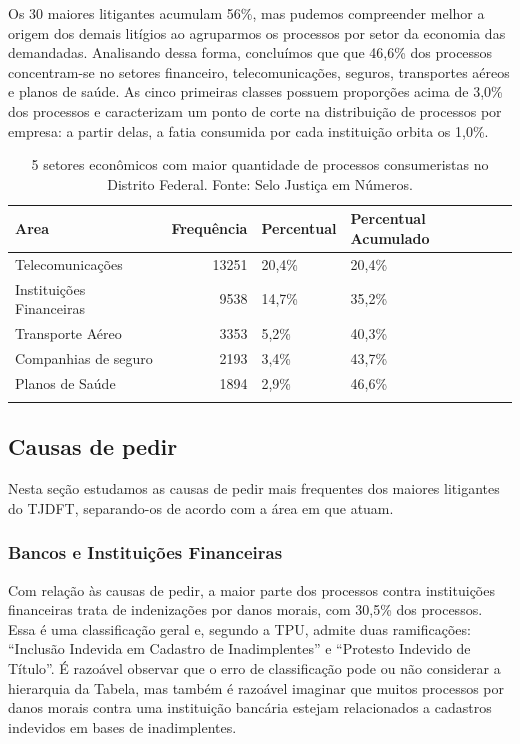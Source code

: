 \documentclass[]{report}
\begin{document}
Os 30 maiores litigantes acumulam 56\%, mas pudemos compreender melhor a
origem dos demais litígios ao agruparmos os processos por setor da
economia das demandadas. Analisando dessa forma, concluímos que que
46,6\% dos processos concentram-se no setores financeiro,
telecomunicações, seguros, transportes aéreos e planos de saúde. As
cinco primeiras classes possuem proporções acima de 3,0\% dos processos
e caracterizam um ponto de corte na distribuição de processos por
empresa: a partir delas, a fatia consumida por cada instituição orbita
os 1,0\%.

\begin{longtable}{lrll}
\caption{5 setores econômicos com maior quantidade de processos consumeristas no Distrito Federal. Fonte: Selo Justiça em Números.} \\
  \hline
Area & Frequência & Percentual & Percentual Acumulado \\
  \hline
Telecomunicações & 13251 & 20,4\% & 20,4\% \\
  Instituições
Financeiras & 9538 & 14,7\% & 35,2\% \\
  Transporte
Aéreo & 3353 & 5,2\% & 40,3\% \\
  Companhias de
seguro & 2193 & 3,4\% & 43,7\% \\
  Planos de Saúde & 1894 & 2,9\% & 46,6\% \\
   \hline
\hline
\label{unnamed-chunk-56}
\end{longtable}

\subsection{Causas de pedir}\label{causas-de-pedir-4}

Nesta seção estudamos as causas de pedir mais frequentes dos maiores
litigantes do TJDFT, separando-os de acordo com a área em que atuam.

\subsubsection{Bancos e Instituições
Financeiras}\label{bancos-e-instituicoes-financeiras-4}

Com relação às causas de pedir, a maior parte dos processos contra
instituições financeiras trata de indenizações por danos morais, com
30,5\% dos processos. Essa é uma classificação geral e, segundo a TPU,
admite duas ramificações: ``Inclusão Indevida em Cadastro de
Inadimplentes'' e ``Protesto Indevido de Título''. É razoável observar
que o erro de classificação pode ou não considerar a hierarquia da
Tabela, mas também é razoável imaginar que muitos processos por danos
morais contra uma instituição bancária estejam relacionados a cadastros
indevidos em bases de inadimplentes.
\end{document}
